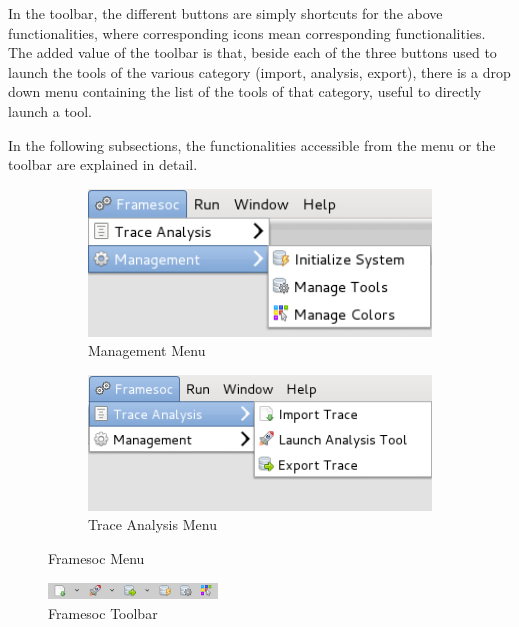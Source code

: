 \documentclass[twoside]{article}
\begin{document}
\begin{sloppypar}
In the toolbar, the different buttons are simply shortcuts for the above functionalities, where corresponding icons mean corresponding functionalities.
The added value of the toolbar is that, beside each of the three buttons used to launch the tools of the various category (import, analysis, export), there is a drop down menu containing the list of the tools of that category, useful to directly launch a tool.

In the following subsections, the functionalities accessible from the menu or the toolbar are explained in detail.

\begin{figure}[h!]
  \centering
  \begin{subfigure}[c]{0.45\textwidth}
    \includegraphics[width=1.0\textwidth]{images/menu_management.png}
    \caption{Management Menu}
    \label{fig:menu_management}
  \end{subfigure}
  \hspace{30pt}
  \begin{subfigure}[c]{0.45\textwidth}
    \includegraphics[width=1.0\textwidth]{images/menu_trace_analysis.png}
    \caption{Trace Analysis Menu}
    \label{fig:menu_trace_analysis}
  \end{subfigure}
  \caption{Framesoc Menu}
  \label{fig:menu}
\end{figure}

\begin{figure}[h!]
  \centering
    \includegraphics[width=0.4\textwidth]{images/toolbar.png}
  \caption{Framesoc Toolbar}
  \label{fig:toolbar}
\end{figure}


\end{sloppypar}
\end{document}
